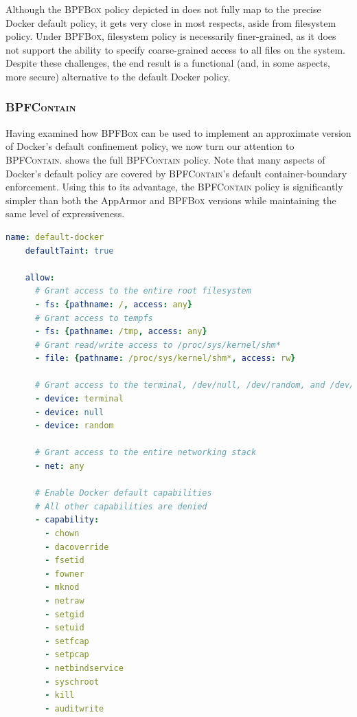 \documentclass[
  fontsize=12pt,
  titlepage=firstiscover,
  paper=letter,
oneside,
  cleardoublepage=plain,
  parskip=half-,
  DIV=10,
  parindent,
  appendixprefix,
  chapterprefix,
  listof=totoc,
]{scrbook}
\newcommand{\bpfbox}{\textsc{BPFBox}}
\newcommand{\bpfcontain}{\textsc{BPFContain}}
\begin{document}
Although the \bpfbox{} policy depicted in  does not fully
map to the precise Docker default policy, it gets very close in most respects, aside from
filesystem policy. Under \bpfbox{}, filesystem policy is necessarily finer-grained, as it
does not support the ability to specify coarse-grained access to all files on the system.
Despite these challenges, the end result is a functional (and, in some aspects, more
secure) alternative to the default Docker policy.

\subsubsection{\bpfcontain{}}

Having examined how \bpfbox{} can be used to implement an approximate version of Docker's
default confinement policy, we now turn our attention to \bpfcontain{}.
 shows the full \bpfcontain{} policy. Note that many
aspects of Docker's default policy are covered by \bpfcontain{}'s default
container-boundary enforcement. Using this to its advantage, the \bpfcontain{} policy is
significantly simpler than both the AppArmor and \bpfbox{} versions while maintaining the
same level of expressiveness.

\begin{lstlisting}[language=yaml, gobble=4,
  caption={[Implementing the default Docker policy in \bpfcontain{}]
    Implementing the default Docker policy in \bpfcontain{}.
},
  label={lst:bpfcontain-docker-default}]
    name: default-docker
    defaultTaint: true

    allow:
      # Grant access to the entire root filesystem
      - fs: {pathname: /, access: any}
      # Grant access to tempfs
      - fs: {pathname: /tmp, access: any}
      # Grant read/write access to /proc/sys/kernel/shm*
      - file: {pathname: /proc/sys/kernel/shm*, access: rw}

      # Grant access to the terminal, /dev/null, /dev/random, and /dev/urandom
      - device: terminal
      - device: null
      - device: random

      # Grant access to the entire networking stack
      - net: any

      # Enable Docker default capabilities
      # All other capabilities are denied
      - capability:
        - chown
        - dacoverride
        - fsetid
        - fowner
        - mknod
        - netraw
        - setgid
        - setuid
        - setfcap
        - setpcap
        - netbindservice
        - syschroot
        - kill
        - auditwrite
\end{lstlisting}
\end{document}
